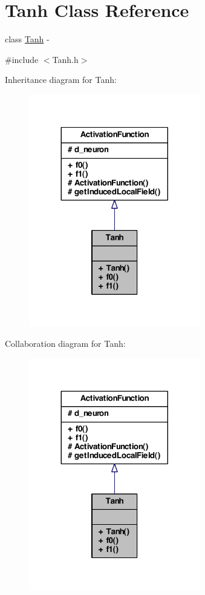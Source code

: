 \hypertarget{class_tanh}{
\section{Tanh Class Reference}
\label{class_tanh}
}


class \hyperlink{class_tanh}{Tanh} -\/  




{\ttfamily \#include $<$Tanh.h$>$}



Inheritance diagram for Tanh:
\nopagebreak
\begin{figure}[H]
\begin{center}
\leavevmode
\includegraphics[width=212pt]{class_tanh__inherit__graph}
\end{center}
\end{figure}


Collaboration diagram for Tanh:
\nopagebreak
\begin{figure}[H]
\begin{center}
\leavevmode
\includegraphics[width=212pt]{class_tanh__coll__graph}
\end{center}
\end{figure}
